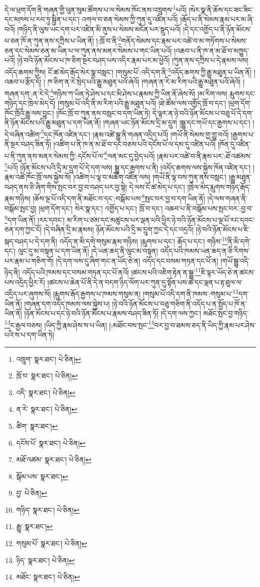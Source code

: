 དེ་ལ་ཕྲག་དོག་ནི་གཞན་གྱི་ཕུན་སུམ་ཚོགས་པ་ལ་སེམས་ཁོང་ནས་འཁྲུགས་\footnote{འཁྲུག་  སྣར་ཐང་།  པེ་ཅིན། }པའོ། །སེར་སྣ་ནི་ཆོས་དང་ཟང་ཟིང་དང་མཁས་པ་རབ་ཏུ་སྦྱིན་པ་དང་། འགལ་བ་ཅན་སེམས་ཀྱི་ཀུན་དུ་འཛིན་པའོ། །རྒོད་པ་ནི་སེམས་རྣམ་པར་མ་ཞི་བའོ། །གཉིད་ནི་ལུས་ཡང་དག་པར་འཛིན་མི་ནུས་པ་སེམས་མངོན་པར་སྡུད་པའོ། །དེ་དང་འགྱོད་པ་ནི་ཉོན་མོངས་པ་ཅན་ཁོ་ན་ཀུན་ནས་དཀྲིས་པ་ཡིན་ནོ། །:ཁྲོ་བ་ནི་\footnote{ཁྲོ་བ་  སྣར་ཐང་།  པེ་ཅིན། }གནོད་སེམས་དང་རྣམ་པར་འཚེ་བ་མ་གཏོགས་པ་སེམས་ཅན་དང་སེམས་ཅན་མ་ཡིན་པ་ལ་ཀུན་ནས་མནར་སེམས་པ་གང་ཡིན་པའོ། །འཆབ་པ་ནི་ཁ་ན་མ་ཐོ་བ་མཁྱུད་པའོ། །ཉེ་བའི་ཉོན་མོངས་པ་ཁ་ཅིག་སྔར་བཤད་པས་འདིར་རྣམ་པར་མ་ཕྱེའོ། །ཀུན་ནས་དཀྲིས་པ་དེ་རྣམས་ལས། འདོད་ཆགས་ཀྱིས། ངོ་ཚ་མེད་རྒོད་སེར་སྣ་བསླང་། །གསུམ་པོ་:འདི་དག་ནི་\footnote{འདི་  སྣར་ཐང་།  པེ་ཅིན། }འདོད་ཆགས་ཀྱི་རྒྱུ་མཐུན་པ་ཡིན་ནོ། །འཆབ་པ་རྩོད་དོ། །
ཁ་ཅིག་ན་རེ་སྲེད་པའི་རྒྱུ་མཐུན་པའོ་ཞེའོ། །གཞན་ན་རེ་མ་རིག་པའི་རྒྱུ་མཐུན་པའོ་ཞེའོ། །གཞན་དག་:ན་རེ་དེ་\footnote{ན་རེ་  སྣར་ཐང་།  པེ་ཅིན། }གཉིས་ཀ་ཡིན་ཏེ་ཤེས་པ་དང་མི་ཤེས་པ་རྣམས་ཀྱི་ཡིན་ནོ་ཞེས་སོ། །མ་རིག་ལས། རྨུགས་དང་གཉིད་དང་ཁྲེལ་མེད་དོ། །གསུམ་པོ་འདི་ནི་མ་རིག་པའི་རྒྱུ་མཐུན་པའོ། །ཐེ་ཚོམ་ལས་འགྱོད་ཁྲོ་བ་དང་། །ཕྲག་དོག་ཁོང་ཁྲོའི་རྒྱུ་ལས་བྱུང་། །ཁོང་ཁྲོ་བ་ཀུན་ནས་བསླང་བ་དག་ཡིན་ཏེ། དེ་ལྟར་ན་ཉེ་བའི་ཉོན་མོངས་པ་བཅུ་པོ་དེ་དག་ནི་ཉོན་མོངས་པའི་རྒྱུ་མཐུན་པ་དག་ཡིན་ནོ། །གཞན་ཡང་ཉོན་མོངས་དྲི་མ་དྲུག །སྒྱུ་དང་གཡོ་དང་རྒྱགས་པ་དང་། །དེ་བཞིན་འཚིག་\footnote{ཚིག་  སྣར་ཐང་། }དང་ཁོན་འཛིན་དང་། །རྣམ་འཚེ་སྒྱུ་ནི་གཞན་འདྲིད་པའོ། །གཡོ་ནི་སེམས་གྱ་གྱུ་བའོ། །རྒྱགས་པ་ནི་སྔར་བཤད་ཟིན་ཏོ། །འཚིག་པ་ནི་ཁ་ན་མ་ཐོ་བ་དང་བཅས་པའི་དངོས་པོ་ལ་དམ་དུ་འཛིན་པའོ། །ཁོན་དུ་འཛིན་པ་ནི་ཀུན་ནས་མནར་སེམས་ཀྱི་:དངོས་པོ་ལ་\footnote{དངོས་པོ་  སྣར་ཐང་།  པེ་ཅིན། }ལན་མང་དུ་བྱེད་པའོ། །རྣམ་པར་འཚེ་བ་ནི་རྣམ་པར་:ཐོ་འཚམས་\footnote{མཐོ་འཚམ་  སྣར་ཐང་།  པེ་ཅིན། }པའོ། །ཉོན་མོངས་པའི་དྲི་མ་དྲུག་པོ་དེ་དག་ལས། སྒྱུ་དང་རྒྱགས་པ་ནི། །འདོད་ཆགས་ལས་སྐྱེས་ཁོན་འཛིན་དང་། །རྣམ་འཚེ་ཁོང་ཁྲོ་ལས་སྐྱེས་སོ། །འཚིག་པ་ལྟ་བ་མཆོག་འཛིན་ལས། །གཡོ་ནི་ལྟ་བས་ཀུན་ནས་བསླང་། །རྒྱུ་མཐུན་བཤད་ནས་ཅི་ཞིག་གིས་སྤང་བར་བྱ་བ་བཤད་པར་བྱ་སྟེ། དེ་ལས་ངོ་ཚ་མེད་པ་དང་། །ཁྲེལ་མེད་རྨུགས་གཉིད་རྒོད་རྣམ་གཉིས། །ཆོས་ལྔ་པོ་འདི་དག་ནི་མཐོང་བ་དང་:བསྒོམ་པས་\footnote{སྒོམ་པས་  སྣར་ཐང་། }སྤང་བར་བྱ་བ་དག་ཡིན་ནོ། །དེ་ལས་གཞན་ནི་བསྒོམ་སྤང་བྱ། །ཕྲག་དོག་དང་། སེར་སྣ་དང་། འགྱོད་པ་དང་། ཁྲོ་བ་དང་། འཆབ་པ་ནི་བསྒོམ་པས་སྤང་བར་:བྱ་བ་\footnote{བྱ་  པེ་ཅིན། }དག་ཡིན་ནོ། །རང་དབང་། མ་རིག་པ་ཙམ་དང་མཚུངས་པར་ལྡན་པའི་ཕྱིར་ཉེ་བའི་ཉོན་མོངས་པ་ལྔ་པོ་རང་དབང་ཅན་དག་ཀྱང་ངོ། །དེ་བཞིན་དྲི་མ་རྣམས། ཉོན་མོངས་པའི་དྲི་མ་དྲུག་ཀྱང་དེ་དང་འདྲའོ། །ཉེ་བའི་ཉོན་མོངས་པ་ཇི་སྐད་བཤད་པ་དེ་དག་ནི། འདོད་ན་མི་དགེ་གསུམ་རྣམ་གཉིས། །རྨུགས་པ་དང་། རྒོད་པ་དང་། གཉིས་\footnote{གཉིད་  སྣར་ཐང་།  པེ་ཅིན། }ནི་མི་དགེ་དང་། ལུང་དུ་མ་བསྟན་པ་དག་ཡིན་ནོ། །དེ་ཡན་ཆད་ནི་ལུང་མ་བསྟན། འདོད་པའི་ཁམས་ཡན་ཆད་ན་ཅི་རིགས་པར་རྣམ་པ་གཅིག་གོ། །དེ་དག་ལས་དུ་ཞིག་གང་ན་ཡོད་ཅེ་ན། འདོད་དང་བསམ་གཏན་དང་པོ་ན། །གཡོ་སྒྱུ་འདི་ཉིད་ནི། འདོད་པའི་ཁམས་དང་བསམ་གཏན་དང་པོ་ནའོ། །ཚངས་པའི་འཇིག་རྟེན་ན་སྒྱུ་\footnote{རྒྱུ་  སྣར་ཐང་། }ཇི་ལྟར་ཡོད་ཅེ་ན་ཚངས་པས་འདྲིད་ཕྱིར་རོ། །ཚངས་པ་ཆེན་པོ་ནི་དེ་ན་བདག་ཉིད་ལོག་པར་ཀུན་དུ་སྟོན་པས་ཚེ་དང་ལྡན་པ་རྟ་ཐུལ་ལ་འདྲིད་པར་ཞུགས་སོ། །རྨུགས་རྒོད་རྒྱགས་པ་ཁམས་གསུམ་ན། །གསུམ་པོ་འདི་དག་ནི་ཁམས་:གསུམ་པ་\footnote{གསུམ་པོ་  སྣར་ཐང་།  པེ་ཅིན། }དག་ཡིན་ནོ། །གཞན་དག་འདོད་ཁམས་ལས་སྐྱེས་པ། །ཉེ་བའི་ཉོན་མོངས་པ་བཅུ་གཅིག་ནི་འདོད་པ་ན་སྤྱོད་པ་ཁོ་ན་ཡིན་ནོ། །ཉོན་མོངས་པ་དང་ཉེ་བའི་ཉོན་མོངས་པ་རྣམས་བཤད་ཟིན་ཏོ། །དེ་དག་ལས་ཀྱང་། མཐོང་སྤང་བྱ་གཉིད་\footnote{ཉིད་  སྣར་ཐང་།  པེ་ཅིན། }ང་རྒྱལ་བཅས། །ཡིད་ཀྱི་རྣམ་ཤེས་ས་པ་ཡིན། །:མཐོང་བས་སྤང་\footnote{མཐོང་  སྣར་ཐང་།  པེ་ཅིན། }བར་བྱ་བ་ཐམས་ཅད་ནི་ཡིད་ཀྱི་རྣམ་པར་ཤེས་པའི་ས་པ་དག་ཡིན་ཏེ། 